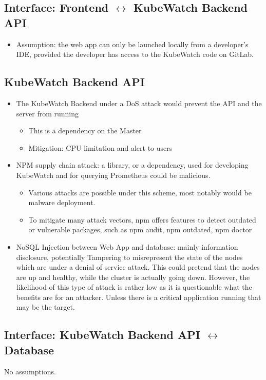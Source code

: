\subsection{Interface: Frontend \(\leftrightarrow\) KubeWatch Backend API}
\begin{itemize}
    \item Assumption: the web app can only be launched locally from a developer's IDE, provided the developer has access to the KubeWatch code on GitLab.
\end{itemize}

\subsection{KubeWatch Backend API}
\begin{itemize}
    \item The KubeWatch Backend under a DoS attack would prevent the API and the server from running
        \begin{itemize}
            \item This is a dependency on the Master
            \item Mitigation: CPU limitation and alert to users
        \end{itemize}
    \item NPM supply chain attack: a library, or a dependency, used for developing KubeWatch and for querying Prometheus could be malicious.
        \begin{itemize}
            \item Various attacks are possible under this scheme, most notably would be malware deployment.
            \item To mitigate many attack vectors, npm offers features to detect outdated or vulnerable packages, such as npm audit, npm outdated, npm doctor
        \end{itemize} 
    \item NoSQL Injection between Web App and database: mainly information disclosure, potentially Tampering to misrepresent the state of the nodes which are under a denial of service attack. This could pretend that the nodes are up and healthy, while the cluster is actually going down. However, the likelihood of this type of attack is rather low as it is questionable what the benefits are for an attacker. Unless there is a critical application running that may be the target.  
\end{itemize}

\subsection{Interface: KubeWatch Backend API \(\leftrightarrow\) Database}
No assumptions.

